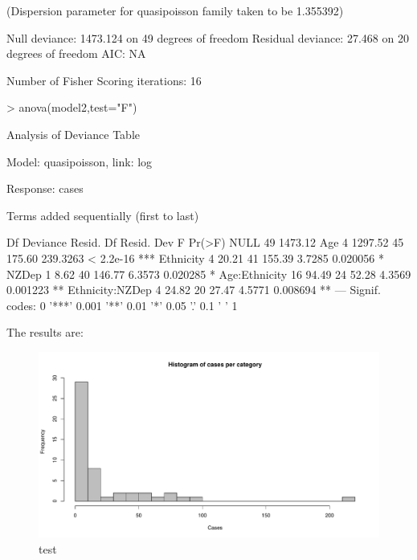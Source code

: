 \documentclass{article}
\begin{document}
\begin{Schunk}
\begin{Soutput}
(Dispersion parameter for quasipoisson family taken to be 1.355392)

    Null deviance: 1473.124  on 49  degrees of freedom
Residual deviance:   27.468  on 20  degrees of freedom
AIC: NA

Number of Fisher Scoring iterations: 16
\end{Soutput}
\end{Schunk}

\begin{Schunk}
\begin{Sinput}
> anova(model2,test="F")
\end{Sinput}
\begin{Soutput}
Analysis of Deviance Table

Model: quasipoisson, link: log

Response: cases

Terms added sequentially (first to last)


                Df Deviance Resid. Df Resid. Dev        F    Pr(>F)    
NULL                               49    1473.12                       
Age              4  1297.52        45     175.60 239.3263 < 2.2e-16 ***
Ethnicity        4    20.21        41     155.39   3.7285  0.020056 *  
NZDep            1     8.62        40     146.77   6.3573  0.020285 *  
Age:Ethnicity   16    94.49        24      52.28   4.3569  0.001223 ** 
Ethnicity:NZDep  4    24.82        20      27.47   4.5771  0.008694 ** 
---
Signif. codes:  0 '***' 0.001 '**' 0.01 '*' 0.05 '.' 0.1 ' ' 1
\end{Soutput}
\end{Schunk}


The results are:
\begin{figure}[h!]
\begin{center}
\includegraphics{interimreport2-024}
\end{center}
\caption{test}
\label{fig:test}
\end{figure}
\end{document}

